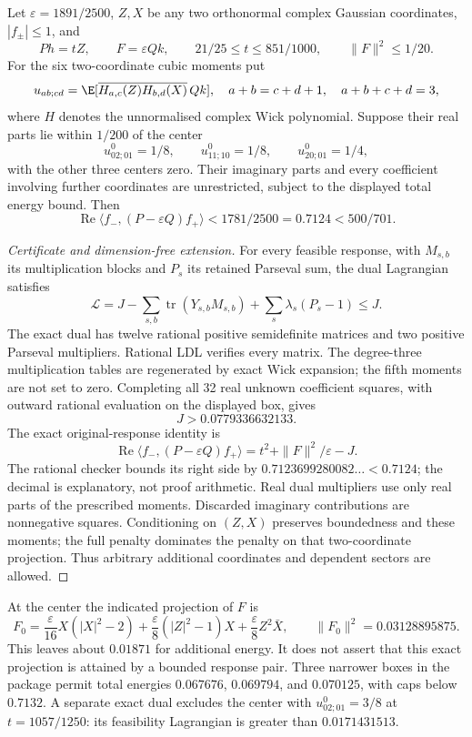 \begin{theorem}
\label{thm:response-moment-slab}
Let $\varepsilon=1891/2500$, $Z,X$ be any two orthonormal complex Gaussian
coordinates, $|f_\pm|\le1$, and
\[
 Ph=tZ,\qquad F=\varepsilon Qk,\qquad
 21/25\le t\le851/1000,\qquad \|F\|^2\le1/20.
\]
For the six two-coordinate cubic moments put
\[
 u_{ab;cd}=\E[\overline{H_{a,c}(Z)H_{b,d}(X)}\,Qk],
 \quad a+b=c+d+1,\quad a+b+c+d=3,
\]
where $H$ denotes the unnormalised complex Wick polynomial.
Suppose their real parts lie within $1/200$ of the center
\[
 u^0_{02;01}=1/8,\qquad u^0_{11;10}=1/8,\qquad
 u^0_{20;01}=1/4,
\]
with the other three centers zero. Their imaginary parts and every
coefficient involving further coordinates are unrestricted, subject to
the displayed total energy bound. Then
\[
 \boxed{\quad
 \operatorname{Re}\langle f_-,(P-\varepsilon Q)f_+\rangle
 <1781/2500=0.7124<500/701.
 \quad}
\]
\end{theorem}
\begin{proof}[Certificate and dimension-free extension]
For every feasible response, with $M_{s,b}$ its multiplication blocks
and $P_s$ its retained Parseval sum, the dual Lagrangian satisfies
\[
 \mathcal L=J-\sum_{s,b}\operatorname{tr}(Y_{s,b}M_{s,b})
              +\sum_s\lambda_s(P_s-1)\le J.
\]
The exact dual has twelve rational positive semidefinite matrices and
two positive Parseval multipliers. Rational LDL verifies every matrix.
The degree-three multiplication tables are regenerated by exact Wick
expansion; the fifth moments are not set to zero. Completing all 32
real unknown coefficient squares, with outward rational evaluation on
the displayed box, gives
\[
 J>0.0779336632133.
\]
The exact original-response identity is
\[
 \operatorname{Re}\langle f_-,(P-\varepsilon Q)f_+\rangle
 =t^2+\|F\|^2/\varepsilon-J.
\]
The rational checker bounds its right side by
$0.7123699280082\ldots<0.7124$; the decimal is explanatory, not proof
arithmetic. Real dual multipliers use only real parts of the prescribed
moments. Discarded imaginary contributions are nonnegative squares.
Conditioning on $(Z,X)$ preserves boundedness and these moments; the
full penalty dominates the penalty on that two-coordinate projection.
Thus arbitrary additional coordinates and dependent sectors are allowed.
\end{proof}

At the center the indicated projection of $F$ is
\[
 F_0=\frac\varepsilon{16}X(|X|^2-2)
 +\frac\varepsilon8(|Z|^2-1)X+\frac\varepsilon8Z^2\bar X,
 \qquad \|F_0\|^2=0.03128895875.
\]
This leaves about $0.01871$ for additional energy. It does not assert
that this exact projection is attained by a bounded response pair.
Three narrower boxes in the package permit total energies
$0.067676$, $0.069794$, and $0.070125$, with caps below $0.7132$.
A separate exact dual excludes the center with $u^0_{02;01}=3/8$
at $t=1057/1250$: its feasibility Lagrangian is greater than $0.0171431513$.

